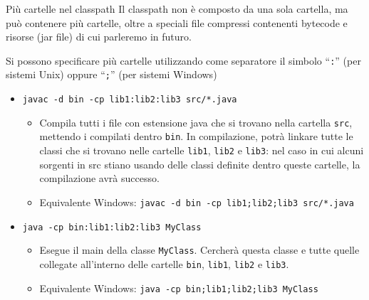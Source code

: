 \documentclass[presentation]{beamer}
\begin{document}
\begin{frame}{Più cartelle nel classpath}
  Il classpath non è composto da una sola cartella, ma può contenere più cartelle, oltre a speciali file compressi contenenti bytecode e risorse (jar file) di cui parleremo in futuro.
  
  \begin{block}{}
  Si possono specificare più cartelle utilizzando come separatore il simbolo ``\texttt{:}'' (per sistemi Unix) oppure ``\texttt{;}'' (per sistemi Windows)
  \begin{itemize}
    \item \texttt{javac -d bin -cp lib1:lib2:lib3 src/*.java}
    \begin{itemize}
      \item Compila tutti i file con estensione java che si trovano nella cartella \texttt{src}, mettendo i compilati dentro \texttt{bin}. In compilazione, potrà linkare tutte le classi che si trovano nelle cartelle \texttt{lib1}, \texttt{lib2} e \texttt{lib3}: nel caso in cui alcuni sorgenti in src stiano usando delle classi definite dentro queste cartelle, la compilazione avrà successo.
      \item \scriptsize{Equivalente Windows: \texttt{javac -d bin -cp lib1;lib2;lib3 src/*.java}}
    \end{itemize}
    \item \texttt{java -cp bin:lib1:lib2:lib3 MyClass}
    \begin{itemize}
      \item Esegue il main della classe \texttt{MyClass}. Cercherà questa classe e tutte quelle collegate all'interno delle cartelle \texttt{bin}, \texttt{lib1}, \texttt{lib2} e \texttt{lib3}.
      \item \scriptsize{Equivalente Windows: \texttt{java -cp bin;lib1;lib2;lib3 MyClass}}
    \end{itemize}
  \end{itemize}

  \end{block}
\end{frame}
\end{document}
